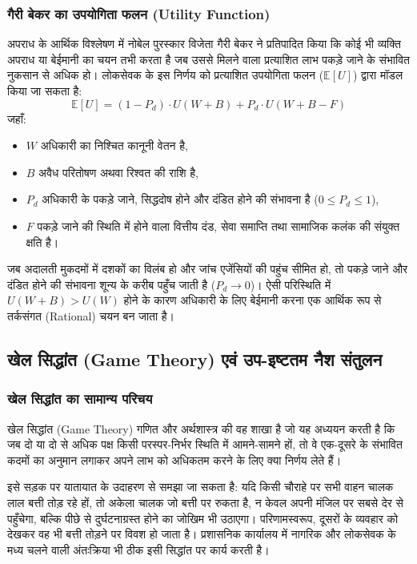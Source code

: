 \documentclass[11pt, a4paper]{article}
\begin{document}
\subsubsection{गैरी बेकर का उपयोगिता फलन (Utility Function)}
अपराध के आर्थिक विश्लेषण में नोबेल पुरस्कार विजेता गैरी बेकर \citep{becker1968} ने प्रतिपादित किया कि कोई भी व्यक्ति अपराध या बेईमानी का चयन तभी करता है जब उससे मिलने वाला प्रत्याशित लाभ पकड़े जाने के संभावित नुकसान से अधिक हो। लोकसेवक के इस निर्णय को प्रत्याशित उपयोगिता फलन ($\mathbb{E}[U]$) द्वारा मॉडल किया जा सकता है:
\begin{equation}
\mathbb{E}[U] = (1 - P_d) \cdot U(W + B) + P_d \cdot U(W + B - F)
\end{equation}
जहाँ:
\begin{itemize}
    \item $W$ अधिकारी का निश्चित कानूनी वेतन है,
    \item $B$ अवैध परितोषण अथवा रिश्वत की राशि है,
    \item $P_d$ अधिकारी के पकड़े जाने, सिद्धदोष होने और दंडित होने की संभावना है ($0 \le P_d \le 1$),
    \item $F$ पकड़े जाने की स्थिति में होने वाला वित्तीय दंड, सेवा समाप्ति तथा सामाजिक कलंक की संयुक्त क्षति है।
\end{itemize}

जब अदालती मुकदमों में दशकों का विलंब हो और जांच एजेंसियों की पहुंच सीमित हो, तो पकड़े जाने और दंडित होने की संभावना शून्य के करीब पहुँच जाती है ($P_d \to 0$)। ऐसी परिस्थिति में $U(W + B) > U(W)$ होने के कारण अधिकारी के लिए बेईमानी करना एक आर्थिक रूप से तर्कसंगत (Rational) चयन बन जाता है।

\subsection{खेल सिद्धांत (Game Theory) एवं उप-इष्टतम नैश संतुलन}

\subsubsection{खेल सिद्धांत का सामान्य परिचय}
खेल सिद्धांत (Game Theory) गणित और अर्थशास्त्र की वह शाखा है जो यह अध्ययन करती है कि जब दो या दो से अधिक पक्ष किसी परस्पर-निर्भर स्थिति में आमने-सामने हों, तो वे एक-दूसरे के संभावित कदमों का अनुमान लगाकर अपने लाभ को अधिकतम करने के लिए क्या निर्णय लेते हैं। 

इसे सड़क पर यातायात के उदाहरण से समझा जा सकता है: यदि किसी चौराहे पर सभी वाहन चालक लाल बत्ती तोड़ रहे हों, तो अकेला चालक जो बत्ती पर रुकता है, न केवल अपनी मंजिल पर सबसे देर से पहुँचेगा, बल्कि पीछे से दुर्घटनाग्रस्त होने का जोखिम भी उठाएगा। परिणामस्वरूप, दूसरों के व्यवहार को देखकर वह भी बत्ती तोड़ने पर विवश हो जाता है। प्रशासनिक कार्यालय में नागरिक और लोकसेवक के मध्य चलने वाली अंतःक्रिया भी ठीक इसी सिद्धांत पर कार्य करती है।
\end{document}
